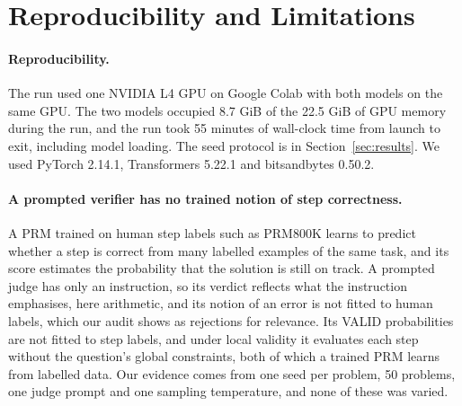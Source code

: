 \documentclass{article}
\begin{document}
\section{Reproducibility and Limitations}
\label{sec:repro}

\paragraph{Reproducibility.} The run used one NVIDIA L4 GPU on Google Colab with both models on the same GPU. The two models occupied 8.7 GiB of the 22.5 GiB of GPU memory during the run, and the run took 55 minutes of wall-clock time from launch to exit, including model loading. The seed protocol is in Section~\ref{sec:results}. We used PyTorch 2.14.1, Transformers 5.22.1 and bitsandbytes 0.50.2.

\paragraph{A prompted verifier has no trained notion of step correctness.} A PRM trained on human step labels such as PRM800K \citep{lightman2023letsverifystepstep} learns to predict whether a step is correct from many labelled examples of the same task, and its score estimates the probability that the solution is still on track. A prompted judge has only an instruction, so its verdict reflects what the instruction emphasises, here arithmetic, and its notion of an error is not fitted to human labels, which our audit shows as rejections for relevance. Its VALID probabilities are not fitted to step labels, and under local validity it evaluates each step without the question's global constraints, both of which a trained PRM learns from labelled data. Our evidence comes from one seed per problem, 50 problems, one judge prompt and one sampling temperature, and none of these was varied.



\end{document}
